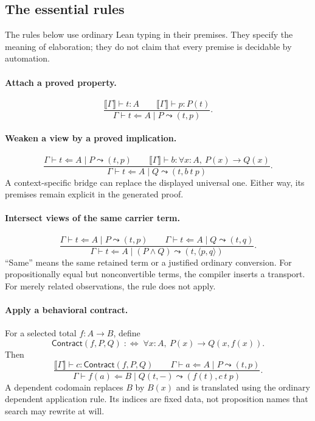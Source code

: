 \documentclass[11pt,letterpaper]{article}
\newcommand{\sem}[1]{\llbracket #1\rrbracket}
\newcommand{\Contract}{\mathsf{Contract}}
\theoremstyle{definition}
\theoremstyle{remark}
\begin{document}
\subsection{The essential rules}
The rules below use ordinary Lean typing in their premises. They specify the
meaning of elaboration; they do not claim that every premise is decidable by
automation.

\paragraph{Attach a proved property.}
\[
\frac{\sem\Gamma\vdash t:A\qquad\sem\Gamma\vdash p:P(t)}
     {\Gamma\vdash t\Leftarrow A\mid P\leadsto(t,p)}.
\]

\paragraph{Weaken a view by a proved implication.}
\[
\frac{\Gamma\vdash t\Leftarrow A\mid P\leadsto(t,p)
\qquad\sem\Gamma\vdash b:\forall x:A,\ P(x)\to Q(x)}
     {\Gamma\vdash t\Leftarrow A\mid Q\leadsto(t,b\ t\ p)}.
\]
A context-specific bridge can replace the displayed universal one. Either way,
its premises remain explicit in the generated proof.

\paragraph{Intersect views of the same carrier term.}
\[
\frac{\Gamma\vdash t\Leftarrow A\mid P\leadsto(t,p)
\qquad\Gamma\vdash t\Leftarrow A\mid Q\leadsto(t,q)}
     {\Gamma\vdash t\Leftarrow A\mid(P\wedge Q)
       \leadsto(t,\langle p,q\rangle)}.
\]
``Same'' means the same retained term or a justified ordinary conversion. For
propositionally equal but nonconvertible terms, the compiler inserts a transport.
For merely related observations, the rule does not apply.

\paragraph{Apply a behavioral contract.}
For a selected total $f:A\to B$, define
\[
 \Contract(f,P,Q)\;:\!\!\iff\;
       \forall x:A,\ P(x)\to Q(x,f(x)).
\]
Then
\[
\frac{\sem\Gamma\vdash c:\Contract(f,P,Q)
\qquad\Gamma\vdash a\Leftarrow A\mid P\leadsto(t,p)}
 {\Gamma\vdash f(a)\Leftarrow B\mid Q(t,-)
     \leadsto(f(t),c\ t\ p)}.
\]
A dependent codomain replaces $B$ by $B(x)$ and is translated using the ordinary
dependent application rule. Its indices are fixed data, not proposition names
that search may rewrite at will.
\end{document}
